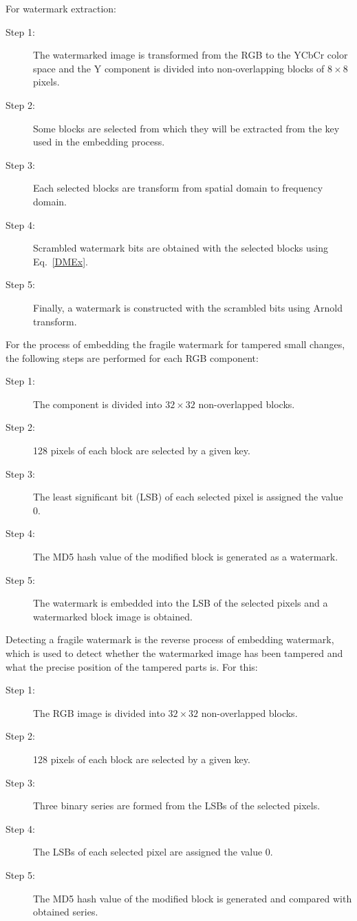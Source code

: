 \documentclass[runningheads]{llncs}
\begin{document}
For watermark extraction:
\begin{description}
	\item[Step 1:] The watermarked image is transformed from the RGB to the YCbCr color space and the Y component is divided into non-overlapping blocks of $8\times 8$ pixels.
	\item[Step 2:] Some blocks are selected from which they will be extracted from the key used in the embedding process.
	\item[Step 3:] Each selected blocks are transform from spatial domain to frequency domain.
	\item[Step 4:] Scrambled watermark bits are obtained with the selected blocks using Eq.~\ref{DMEx}.
	\item[Step 5:] Finally, a watermark is constructed with the scrambled bits using Arnold transform.
\end{description}

For the process of embedding the fragile watermark for tampered small changes, the following steps are performed for each RGB component:
\begin{description}
	\item[Step 1:] The component is divided into $32\times 32$ non-overlapped blocks.
	\item[Step 2:] 128 pixels of each block are selected by a given key.
	\item[Step 3:] The least significant bit (LSB) of each selected pixel is assigned the value 0.
	\item[Step 4:] The MD5 hash value of the modified block is generated as a watermark.
	\item[Step 5:] The watermark is embedded into the LSB of the selected pixels and a watermarked block image is obtained.
\end{description}

Detecting a fragile watermark is the reverse process of embedding watermark, which is used to detect whether the watermarked image has been tampered and what the precise position of the tampered parts is. For this:
\begin{description}
	\item[Step 1:] The RGB image is divided into $32\times 32$ non-overlapped blocks.
	\item[Step 2:] 128 pixels of each block are selected by a given key.
	\item[Step 3:] Three binary series are formed from the LSBs of the selected pixels.
	\item[Step 4:] The LSBs of each selected pixel are assigned the value 0.
	\item[Step 5:] The MD5 hash value of the modified block is generated and compared with obtained series.
\end{description}
\end{document}
